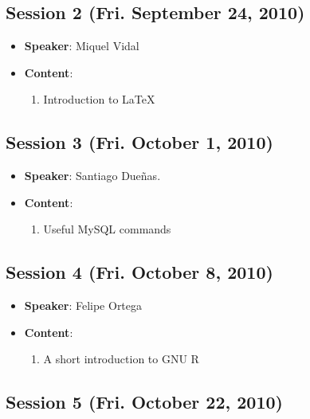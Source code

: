 \documentclass[a4paper]{article}
\begin{document}
\subsection{Session 2 (Fri. September 24, 2010)}

\begin{itemize}
 \item \textbf{Speaker}: Miquel Vidal

 \item \textbf{Content}:

  \begin{enumerate}
   \item Introduction to LaTeX
  \end{enumerate}

\end{itemize}

\subsection{Session 3 (Fri. October 1, 2010)}

  \begin{itemize}
   \item \textbf{Speaker}: Santiago Dueñas.

   \item \textbf{Content}:

   \begin{enumerate}
    \item Useful MySQL commands
   \end{enumerate}

  \end{itemize}

\subsection{Session 4 (Fri. October 8, 2010)}

\begin{itemize}
 \item \textbf{Speaker}: Felipe Ortega

  \item \textbf{Content}:

  \begin{enumerate}
   \item A short introduction to GNU R
  \end{enumerate}

\end{itemize}

\subsection{Session 5 (Fri. October 22, 2010)}
\end{document}
